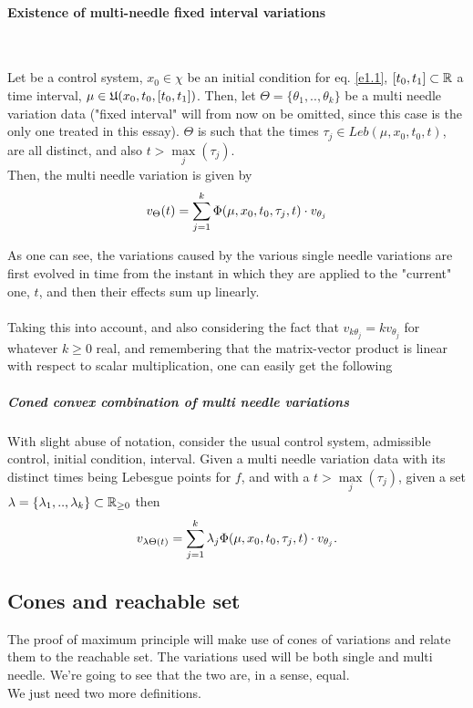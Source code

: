 \paragraph[4.12]{Existence of multi-needle fixed interval variations}\mbox{}\\
\begin{teo}
	Let \controlSystem\space be a control system, $x_0\in\chi$ be an initial condition for eq. \eqref{e1.1}, $[t_0,t_1]\subset\mathbb{R}$ a time interval, $\mu\in\mathfrak{U}(x_0,t_0,[t_0,t_1])$. Then, let $\Theta=\{\theta_1,..,\theta_k\}$ be a multi needle variation data ("fixed interval" will from now on be omitted, since this case is the only one treated in this essay). $\Theta$ is such that the times $\tau_j\in Leb(\mu,x_0,t_0,t)$, are all distinct, and also $t>\underset{j}{\max}(\tau_j)$.\\
Then, the multi needle variation is given by
\[v_\Theta(t)=\sum_{j=1}^{k}\Phi(\mu,x_0,t_0,\tau_j,t)\cdot v_{\theta_j} \]
\label{4-12}
\end{teo}
As one can see, the variations caused by the various single needle variations are first evolved in time from the instant in which they are applied to the "current" one, $t$, and then their effects sum up linearly.\\\\
Taking this into account, and also considering the fact that $v_{k\theta_j}=kv_{\theta_j}$ for whatever $k\geq0$ real, and remembering that the matrix-vector product is linear with respect to scalar multiplication, one can easily get the following
\subparagraph[4.13]{Coned convex combination of multi needle variations} 
\begin{cor}
	With slight abuse of notation, consider the usual control system, admissible control, initial condition, interval. Given a multi needle variation data with its distinct times being Lebesgue points for $f$, and with a $t>\underset{j}{\max}(\tau_j)$, given a set $\lambda=\{\lambda_1,..,\lambda_k\}\subset\mathbb{R}_{\geq0}$ then
\[ v_{\lambda\Theta(t)}=\sum_{j=1}^{k}\lambda_j\Phi(\mu,x_0,t_0,\tau_j,t)\cdot v_{\theta_j}. \]
\label{4-13}
\end{cor}

\subsection{Cones and reachable set}
The proof of maximum principle will make use of cones of variations and relate them to the reachable set. The variations used will be both single and multi needle. We're going to see that the two are, in a sense, equal.\\ We just need two more definitions.\\ 

